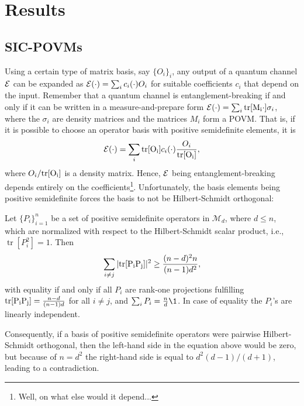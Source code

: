 \chapter{Results}\label{ch:own_results}
\section{SIC-POVMs}\label{sec:sic-povm}
Using a certain type of matrix basis, say $\{O_i\}_i$, any output of a quantum channel $\mathcal E$ can be expanded as $\mathcal E(\cdot) = \sum_i c_i(\cdot) O_i$ for suitable coefficients $c_i$ that depend on the input. Remember that a quantum channel is entanglement-breaking if and only if it can be written in a measure-and-prepare form $\mathcal E (\cdot)= \sum_i \mathrm{tr[M_i \cdot ]}\sigma_i$, where the $\sigma_i$ are density matrices and the matrices $M_i$ form a POVM. That is, if it is possible to choose an operator basis with positive semidefinite elements, it is
\begin{align}
    \mathcal E (\cdot)=\sum_i \mathrm{tr[O_i]}c_i(\cdot) \frac{O_i}{\mathrm{tr[O_i]}},
\end{align}
where $O_i/\mathrm{tr[O_i]}$ is a density matrix. Hence, $\mathcal E$ being entanglement-breaking depends entirely on the coefficients\footnote{Well, on what else would it depend...}. Unfortunately, the basis elements being positive semidefinite forces the basis to not be Hilbert-Schmidt orthogonal:
\begin{lemma}\label{lem:sic}
Let $\{P_i\}_{i=1}^n$ be a set of positive semidefinite operators in $\mathcal{M}_d$, where $d \leq n$, which are normalized with respect to the Hilbert-Schmidt scalar product, i.e., $\operatorname{tr}[P_i^2] = 1$. Then
\begin{align*}
    \sum_{i \neq j} |\mathrm{tr[P_iP_j]}|^2 \geq \frac{(n-d)^2 n}{(n-1)d^2}, 
\end{align*}
with equality if and only if all $P_i$ are rank-one projections fulfilling $\mathrm{tr[P_i P_j]} = \frac{n-d}{(n-1)d}$ for all $i \neq j$, and $\sum_i P_i = \frac{n}{d}\1$. In case of equality the $P_i$'s are linearly independent.
\end{lemma}

Consequently, if a basis of positive semidefinite operators were pairwise Hilbert-Schmidt orthogonal, then the left-hand side in the equation above would be zero, but because of $n=d^2$ the right-hand side is equal to $d^2(d-1)/(d+1)$, leading to a contradiction. 

